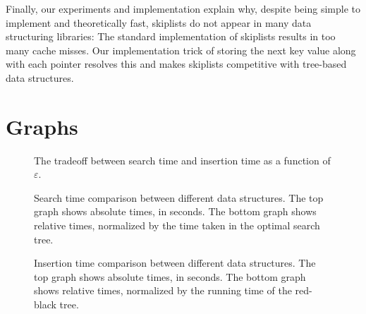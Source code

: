 \documentclass{patmorin}
\newcommand{\eps}{\varepsilon}
\begin{document}
Finally, our experiments and implementation explain why, despite
being simple to implement and theoretically fast, skiplists do not
appear in many data structuring libraries: The standard implementation of
skiplists results in too many cache misses.  Our implementation trick
of storing the next key value along with each pointer resolves this
and makes skiplists competitive with tree-based data structures.



\newpage



\newpage
\appendix
\section{Graphs}

\begin{figure}[hb]
  \centering{}
  \caption{The tradeoff between search time and insertion time as a function of $\eps$.}
\end{figure}

\begin{figure}[hb]
  \centering{}
  \centering{}
  \caption{Search time comparison between different data structures. The top graph shows absolute times, in seconds. The bottom graph shows relative times, normalized by the time taken in the optimal search tree.}
\end{figure}

\begin{figure}[hb]
  \centering{}
  \centering{}
  \caption{Insertion time comparison between different data structures. The top graph shows absolute times, in seconds. The bottom graph shows relative times, normalized by the running time of the red-black tree.}
\end{figure}
\end{document}
